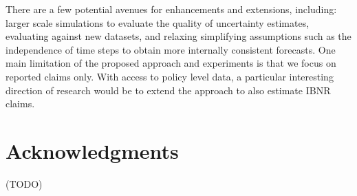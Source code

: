 \documentclass{article}
\begin{document}
There are a few potential avenues for enhancements and extensions, including: larger scale simulations to evaluate the quality of uncertainty estimates, evaluating against new datasets, and relaxing simplifying assumptions such as the independence of time steps to obtain more internally consistent forecasts. One main limitation of the proposed approach and experiments is that we focus on reported claims only. With access to policy level data, a particular interesting direction of research would be to extend the approach to also estimate IBNR claims.

\section{Acknowledgments}

(TODO)

  







% 
% 
% 
\end{document}
